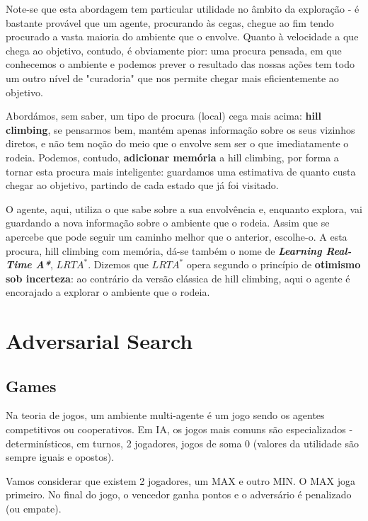 \documentclass[11pt]{article}
\begin{document}
Note-se que esta abordagem tem particular utilidade no âmbito da exploração - é bastante provável que um agente, procurando às cegas, chegue ao fim tendo procurado a vasta maioria do ambiente que o envolve. Quanto à velocidade a que chega ao objetivo, contudo, é obviamente pior: uma procura pensada, em que conhecemos o ambiente e podemos prever o resultado das nossas ações tem todo um outro nível de "curadoria" que nos permite chegar mais eficientemente ao objetivo.\vspace{4pt}

Abordámos, sem saber, um tipo de procura (local) cega mais acima: \textbf{hill climbing}, se pensarmos bem, mantém apenas informação sobre os seus vizinhos diretos, e não tem noção do meio que o envolve sem ser o que imediatamente o rodeia. Podemos, contudo, \textbf{adicionar memória} a hill climbing, por forma a tornar esta procura mais inteligente: guardamos uma estimativa de quanto custa chegar ao objetivo, partindo de cada estado que já foi visitado.\vspace{4pt}

O agente, aqui, utiliza o que sabe sobre a sua envolvência e, enquanto explora, vai guardando a nova informação sobre o ambiente que o rodeia. Assim que se apercebe que pode seguir um caminho melhor que o anterior, escolhe-o. A esta procura, hill climbing com memória, dá-se também o nome de \textbf{\textit{Learning Real-Time A*}}, $LRTA^*$. Dizemos que $LRTA^*$ opera segundo o princípio de \textbf{otimismo sob incerteza}: ao contrário da versão clássica de hill climbing, aqui o agente é encorajado a explorar o ambiente que o rodeia.


\newpage
\section{Adversarial Search}

\subsection{Games}

Na teoria de jogos, um ambiente multi-agente é um jogo sendo os agentes competitivos ou cooperativos. Em IA, os jogos mais comuns são especializados - determinísticos, em turnos, 2 jogadores, jogos de soma 0 (valores da utilidade são sempre iguais e opostos).\vspace{4pt}

Vamos considerar que existem 2 jogadores, um MAX e outro MIN. O MAX joga primeiro. No final do jogo, o vencedor ganha pontos e o adversário é penalizado (ou empate).\vspace{4pt}
\end{document}
